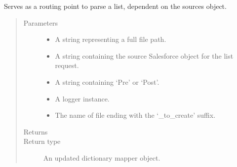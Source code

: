 \documentclass[letterpaper,10pt,english]{sphinxmanual}
\begin{document}
\begin{fulllineitems}
\label{\detokenize{index:ListManagement.utility.processes.id_preprocessing_needs}}
\end{fulllineitems}


\begin{fulllineitems}
\label{\detokenize{index:ListManagement.utility.processes.parse_list_based_on_type}}
Serves as a routing point to parse a list, dependent on the sources object.
\begin{quote}\begin{description}
\item[{Parameters}] \leavevmode\begin{itemize}
\item {} 
 \textendash{} A string representing a full file path.

\item {} 
 \textendash{} A string containing the source Salesforce object for the list request.

\item {} 
 \textendash{} A string containing ‘Pre’ or ‘Post’.

\item {} 
 \textendash{} A logger instance.

\item {} 
 \textendash{} The name of file ending with the ‘\_to\_create’ suffix.

\end{itemize}

\item[{Returns}] \leavevmode


\item[{Return type}] \leavevmode
An updated dictionary mapper object.

\end{description}\end{quote}

\end{fulllineitems}
\end{document}
